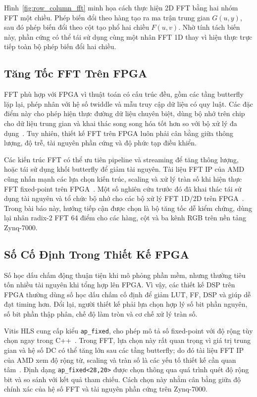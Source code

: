 ﻿\documentclass[conference]{IEEEtran}
\begin{document}
Hình~\ref{fig:row_column_fft} minh họa cách thực hiện 2D FFT bằng hai nhóm FFT một chiều. Phép biến đổi theo hàng tạo ra ma trận trung gian $G(u,y)$, sau đó phép biến đổi theo cột tạo phổ hai chiều $F(u,v)$. Nhờ tính tách biến này, phần cứng có thể tái sử dụng cùng một nhân FFT 1D thay vì hiện thực trực tiếp toàn bộ phép biến đổi hai chiều.

\subsection{Tăng Tốc FFT Trên FPGA}
FFT phù hợp với FPGA vì thuật toán có cấu trúc đều, gồm các tầng butterfly lặp lại, phép nhân với hệ số twiddle và mẫu truy cập dữ liệu có quy luật. Các đặc điểm này cho phép hiện thực đường dữ liệu chuyên biệt, dùng bộ nhớ trên chip cho dữ liệu trung gian và khai thác song song hóa tốt hơn so với bộ xử lý đa dụng~\cite{parhi_1999}. Tuy nhiên, thiết kế FFT trên FPGA luôn phải cân bằng giữa thông lượng, độ trễ, tài nguyên phần cứng và độ phức tạp điều khiển.

Các kiến trúc FFT có thể ưu tiên pipeline và streaming để tăng thông lượng, hoặc tái sử dụng khối butterfly để giảm tài nguyên. Tài liệu FFT IP của AMD cũng nhấn mạnh các lựa chọn kiến trúc, scaling và xử lý tràn số khi hiện thực FFT fixed-point trên FPGA~\cite{amd_fft_pg109}. Một số nghiên cứu trước đó đã khai thác tái sử dụng tài nguyên và tổ chức bộ nhớ cho các bộ xử lý FFT 1D/2D trên FPGA~\cite{mukherjee_fft_fpga_2015,mukherjee_2dfft_2018}. Trong bài báo này, hướng tiếp cận được chọn là bộ tăng tốc dễ kiểm chứng, dùng lại nhân radix-2 FFT 64 điểm cho các hàng, cột và ba kênh RGB trên nền tảng Zynq-7000.

\subsection{Số Cố Định Trong Thiết Kế FPGA}
Số học dấu chấm động thuận tiện khi mô phỏng phần mềm, nhưng thường tiêu tốn nhiều tài nguyên khi tổng hợp lên FPGA. Vì vậy, các thiết kế DSP trên FPGA thường dùng số học dấu chấm cố định để giảm LUT, FF, DSP và giúp dễ đạt timing hơn. Đổi lại, người thiết kế phải lựa chọn hợp lý số bit phần nguyên, số bit phần thập phân, chế độ làm tròn và cơ chế xử lý tràn số.

Vitis HLS cung cấp kiểu \texttt{ap\_fixed}, cho phép mô tả số fixed-point với độ rộng tùy chọn ngay trong C++~\cite{amd_vitis_hls}. Trong FFT, lựa chọn này rất quan trọng vì giá trị trung gian và hệ số DC có thể tăng lớn sau các tầng butterfly; do đó tài liệu FFT IP của AMD xem độ rộng từ, scaling và tràn số là các yếu tố thiết kế cần quan tâm~\cite{amd_fft_pg109}. Định dạng \texttt{ap\_fixed<28,20>} được chọn thông qua quá trình quét độ rộng bit và so sánh với kết quả tham chiếu. Cách chọn này nhằm cân bằng giữa độ chính xác của hệ số FFT và tài nguyên phần cứng trên Zynq-7000.
\end{document}
